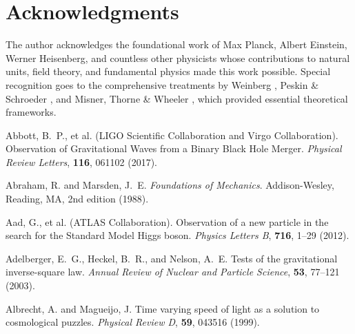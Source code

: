 \documentclass[12pt,a4paper]{article}
\begin{document}
	\section*{Acknowledgments}
	\label{sec:acknowledgments}
	
	The author acknowledges the foundational work of Max Planck, Albert Einstein, Werner Heisenberg, and countless other physicists whose contributions to natural units, field theory, and fundamental physics made this work possible. Special recognition goes to the comprehensive treatments by Weinberg \citep{weinberg1995,weinberg2008}, Peskin \& Schroeder \citep{peskin1995}, and Misner, Thorne \& Wheeler \citep{misner1973}, which provided essential theoretical frameworks.
	
	
	\begin{thebibliography}{99}
		
		Abbott, B.~P., et al. (LIGO Scientific Collaboration and Virgo Collaboration).
		\newblock Observation of Gravitational Waves from a Binary Black Hole Merger.
		\newblock \textit{Physical Review Letters}, \textbf{116}, 061102 (2017).
		\newblock {}
		
		Abraham, R. and Marsden, J.~E.
		\newblock \textit{Foundations of Mechanics}.
		\newblock Addison-Wesley, Reading, MA, 2nd edition (1988).
		
		Aad, G., et al. (ATLAS Collaboration).
		\newblock Observation of a new particle in the search for the Standard Model Higgs boson.
		\newblock \textit{Physics Letters B}, \textbf{716}, 1--29 (2012).
		\newblock {}
		
		Adelberger, E.~G., Heckel, B.~R., and Nelson, A.~E.
		\newblock Tests of the gravitational inverse-square law.
		\newblock \textit{Annual Review of Nuclear and Particle Science}, \textbf{53}, 77--121 (2003).
		\newblock {}
		
		Albrecht, A. and Magueijo, J.
		\newblock Time varying speed of light as a solution to cosmological puzzles.
		\newblock \textit{Physical Review D}, \textbf{59}, 043516 (1999).
		\newblock {}
		

\end{thebibliography}
\end{document}
